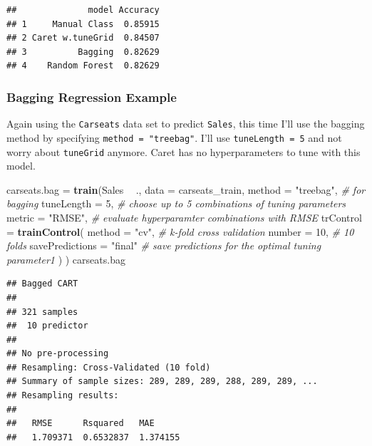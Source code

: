 \documentclass[
]{book}
\newenvironment{Shaded}{\begin{snugshade}}{\end{snugshade}}
\newcommand{\CommentTok}[1]{\textcolor[rgb]{0.56,0.35,0.01}{\textit{#1}}}
\newcommand{\DataTypeTok}[1]{\textcolor[rgb]{0.13,0.29,0.53}{#1}}
\newcommand{\DecValTok}[1]{\textcolor[rgb]{0.00,0.00,0.81}{#1}}
\newcommand{\KeywordTok}[1]{\textcolor[rgb]{0.13,0.29,0.53}{\textbf{#1}}}
\newcommand{\NormalTok}[1]{#1}
\newcommand{\OperatorTok}[1]{\textcolor[rgb]{0.81,0.36,0.00}{\textbf{#1}}}
\newcommand{\StringTok}[1]{\textcolor[rgb]{0.31,0.60,0.02}{#1}}
\begin{document}
\begin{verbatim}
##              model Accuracy
## 1     Manual Class  0.85915
## 2 Caret w.tuneGrid  0.84507
## 3          Bagging  0.82629
## 4    Random Forest  0.82629
\end{verbatim}

\hypertarget{bagging-regression-example}{%
\subsubsection{Bagging Regression Example}\label{bagging-regression-example}}

Again using the \texttt{Carseats} data set to predict \texttt{Sales}, this time I'll use the bagging method by specifying \texttt{method\ =\ "treebag"}. I'll use \texttt{tuneLength\ =\ 5} and not worry about \texttt{tuneGrid} anymore. Caret has no hyperparameters to tune with this model.

\begin{Shaded}
\begin{Highlighting}[]
\NormalTok{carseats.bag =}\StringTok{ }\KeywordTok{train}\NormalTok{(Sales }\OperatorTok{~}\StringTok{ }\NormalTok{., }
               \DataTypeTok{data =}\NormalTok{ carseats_train, }
               \DataTypeTok{method =} \StringTok{"treebag"}\NormalTok{,  }\CommentTok{# for bagging}
               \DataTypeTok{tuneLength =} \DecValTok{5}\NormalTok{,  }\CommentTok{# choose up to 5 combinations of tuning parameters}
               \DataTypeTok{metric =} \StringTok{"RMSE"}\NormalTok{,  }\CommentTok{# evaluate hyperparamter combinations with RMSE}
               \DataTypeTok{trControl =} \KeywordTok{trainControl}\NormalTok{(}
                 \DataTypeTok{method =} \StringTok{"cv"}\NormalTok{,  }\CommentTok{# k-fold cross validation}
                 \DataTypeTok{number =} \DecValTok{10}\NormalTok{,  }\CommentTok{# 10 folds}
                 \DataTypeTok{savePredictions =} \StringTok{"final"}       \CommentTok{# save predictions for the optimal tuning parameter1}
\NormalTok{                 )}
\NormalTok{               )}
\NormalTok{carseats.bag}
\end{Highlighting}
\end{Shaded}

\begin{verbatim}
## Bagged CART 
## 
## 321 samples
##  10 predictor
## 
## No pre-processing
## Resampling: Cross-Validated (10 fold) 
## Summary of sample sizes: 289, 289, 289, 288, 289, 289, ... 
## Resampling results:
## 
##   RMSE      Rsquared   MAE     
##   1.709371  0.6532837  1.374155
\end{verbatim}
\end{document}

